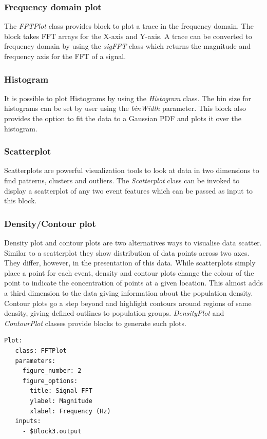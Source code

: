 \documentclass[journal]{IEEEtran}
\begin{document}
\subsubsection{Frequency domain plot}
The \textit{FFTPlot} class provides block to plot a trace in the frequency domain. The block takes FFT arrays for the X-axis and Y-axis. A trace can be converted to frequency domain by using the \textit{sigFFT} class which returns the magnitude and frequency axis for the FFT of a signal.

\subsubsection{Histogram}
It is possible to plot Histograms by using the \textit{Histogram} class. The bin size for histograms can be set by user using the \textit{binWidth} parameter. This block also provides the option to fit the data to a Gaussian PDF and plots it over the histogram.

\subsubsection{Scatterplot}
Scatterplots are powerful visualization tools to look at data in two dimensions to find patterns, clusters and outliers. The \textit{Scatterplot} class can be invoked to display a scatterplot of any two event features which can be passed as input to this block.

\subsubsection{Density/Contour plot}
Density plot and contour plots are two alternatives ways to visualise data scatter. Similar to a scatterplot they show distribution of data points across two axes. They differ, however, in the presentation of this data. While scatterplots simply place a point for each event, density and contour plots change the colour of the point to indicate the concentration of points at a given location. This almost adds a third dimension to the data giving information about the population density. Contour plots go a step beyond and highlight contours around regions of same density, giving defined outlines to population groups. \textit{DensityPlot} and \textit{ContourPlot} classes provide blocks to generate such plots.  

\begin{lstlisting}[caption={Specifying Figure Options Example}]
Plot:
   class: FFTPlot
   parameters:
     figure_number: 2
     figure_options:
       title: Signal FFT
       ylabel: Magnitude
       xlabel: Frequency (Hz)
   inputs:
     - $Block3.output
\end{lstlisting}
\end{document}

